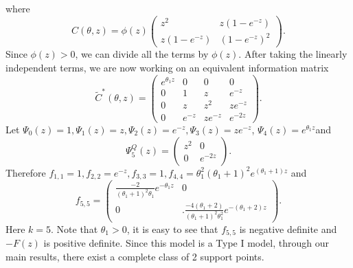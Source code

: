 \documentclass[11pt]{amsart}
\theoremstyle{definition}
\theoremstyle{remark}
\begin{document}
where\[ C(\theta,z) = \phi(z)\left(\begin{array}{cc}
z^2 & z(1-e^{-z})\\
z(1-e^{-z}) & (1-e^{-z})^2
\end{array} \right).\] Since $\phi(z)>0$, we can divide all the terms by $\phi(z)$. After taking the linearly independent terms, we are now working on an equivalent information matrix\[ \tilde{C}^*(\theta,z) = \left(\begin{array}{cccc}
e^{\theta_1z}&0&0&0\\
0&1&z&e^{-z}\\
0&z&z^2 & ze^{-z}\\
0&e^{-z}& ze^{-z} & e^{-2z}
\end{array} \right).\] Let $\Psi_0(z) =1, \Psi_1(z) = z, \Psi_2(z) = e^{-z}, \Psi_3(z) =ze^{-z}$, $\Psi_4(z) =e^{\theta_1z}$and  \[\Psi_5^Q(z)= \left( \begin{array}{cc}
z^2& 0\\
0 &e^{-2z}
\end{array} \right).\]  Therefore $f_{1,1} = 1,f_{2,2} = e^{-z},f_{3,3} = 1,f_{4,4} = \theta_1^2(\theta_1+1)^2e^{(\theta_1+1)z}$ and  \[f_{5,5}= \left( \begin{array}{cc}
\frac{-2}{(\theta_1+1)^2\theta_1}e^{-\theta_1z}& 0\\
0 &. \frac{-4(\theta_1+2)}{(\theta_1+1)^2\theta_1^2}e^{-(\theta_1+2)z}
\end{array} \right).\]  Here $k=5$. Note that $\theta_1>0$, it is easy to see that $f_{5,5}$ is negative definite and $-F(z)$ is positive definite. Since this model is a Type I model, through our main results, there exist a complete class of 2 support points. 
\end{document}
